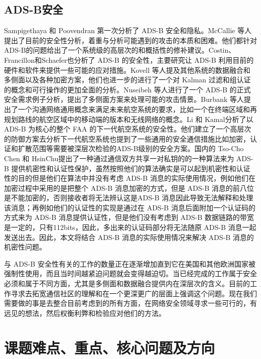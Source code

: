 \subsection{ADS-B安全}
Sampigethaya 和 Poovendran\cite{sampigethaya2011security} 第一次分析了 ADS-B 安全和隐私\cite{sampigethaya2009framework}。McCallie 等人\cite{mccallie2011security}提出了目前的安全性分析，着重与分析可能遇到的攻击的本质和困难。他们都针对ADS-B的问题给出了一个系统级的高层次的和概括性的修补建议。Costin、Francillon和Schaefer\cite{costin2012ghost}也分析了 ADS-B 的安全性，主要研究让 ADS-B 利用目前的硬件和软件来提供一些可能的应对措施\cite{schafer2013experimental}。Kovell 等人\cite{kovell2012comparative}提及其他系统的数据融合和多侧面以及各种加密方案，他们也进一步的进行了一个对 Kalman 过滤和组认证的概念和可行操作的更加全面的分析。Nuseibeh 等人进行了一个 ADS-B 的正式安全需求例子分析，提出了多侧面方案来处理可能的攻击情景\cite{nuseibeh2009securing}。Burbank 等人提出了一个沟通网络通用概念来满足未来航空系统的要求，比如一个在终端区域和再规划路线的航空区域中的移动端的版本和无线网络的概念\cite{burbank2005advanced}。Li 和 Kamal\cite{li2011integrated}分析了以 ADS-B 为核心的整个 FAA 的下一代航空系统的安全性。他们建立了一个高层次的防御方案去分析下一代航空系统也提到了一些通用的安全通信措施比如加密，认证和扩散范围等需要被深层次检验的ADS-B级别的安全方案。国内的 Tso-Cho Chen 和 HsinChu\cite{chen2012authenticated}提出了一种通过通信双方共享一对私钥的的一种算法来为 ADS-B 提供机密性和认证性保护，虽然按照他们的算法确实是可以起到机密性和认证性的目的但是他们在算法中并没有考虑 ADS-B 消息的实际使用情况，例如他们在加密过程中采用的是把整个 ADS-B 消息加密的方式，但是 ADS-B 消息的前八位是不能加密的，否则接收者将无法辨认这是ADS-B 消息因此导致无法解释和处理该消息；再例如他们的认证性的实现是通过在 ADS-B 消息后面附加一个认证码的方式来为 ADS-B 消息提供认证性，但是他们没有考虑到 ADS-B 数据链路的带宽是一定的，只有112bits，因此，多出来的认证码部分将无法随原 ADS-B 消息一起发送出去。因此，本文将结合 ADS-B 消息的实际使用情况来解决 ADS-B 消息的机密性问题。

与 ADS-B 安全性有关的工作的数量正在逐渐增加直到它在美国和其他欧洲国家被强制性使用，而且当时间越紧迫问题就会变得越迫切。当已经完成的工作属于安全必须和属于不同方面，尤其是多侧面和数据融合提供内在深层次的含义。目前的工作寻求去拓宽通信社区的理解和在一个更深更广的层面上强调这个问题。现在我们需要做的事是去整合目前考虑到的所有方面，在网络安全领域寻求一些可行的，有远见的想法，然后权衡利弊和检验应对他们的方法。

\section{课题难点、重点、核心问题及方向}
